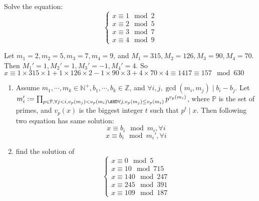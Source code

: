 \documentclass{ctexart}
\begin{document}
\begin{problem}\label{pro:p55.1ii}
  Solve the equation:
  \[
    \begin{cases}
      x \equiv 1 \mod 2 \\
      x \equiv 2 \mod 5 \\
      x \equiv 3 \mod 7 \\
      x \equiv 4 \mod 9
    \end{cases}
  \]
\end{problem}
\begin{solution}
  Let \(m_1=2,m_2=5,m_3=7,m_4=9\), and \(M_1=315,M_2=126,M_3=90,M_4=70\).
  Then \(M_1'=1,M_2'=1,M_3'=-1,M_4'=4\).
  So \(x \equiv 1 \times 315 \times 1 + 1 \times 126 \times 2 - 1 \times 90 \times 3 + 4 \times 70 \times 4 \equiv 1417\equiv 157\mod 630\)
\end{solution}
\begin{problem}\label{pro:3}
  \begin{enumerate}
    \item
      Assume \(m_1,\cdots,m_k \in \mathbb{N}^+,b_1,\cdots,b_k \in \mathbb{Z}\), and \(\forall i,j,\gcd(m_i,m_j) \mid b_i-b_j\).
      Let \(m_i':=\prod_{p \in \mathbb{P},\forall j <i,v_p(m_j)<v_p(m_i) \AND \forall j,v_p(m_j) \leq v_p(m_i)} p^{v_p(m_i)}\), where
      \(\mathbb{P}\) is the set of primes, and \(v_p(x)\) is the biggest integer \(t\) such that \(p^t \mid x\).
      Then following two equation has same solution:
      \begin{equation}\label{equ:1}
        x \equiv b_i \mod m_i,\forall i
      \end{equation}
      \begin{equation}\label{equ:2}
        x \equiv b_i \mod m_i',\forall i
      \end{equation}
    \item find the solution of
      \[
        \begin{cases}
          x \equiv 0 \mod 5     \\
          x \equiv 10 \mod 715  \\
          x \equiv 140 \mod 247 \\
          x \equiv 245 \mod 391 \\
          x \equiv 109 \mod 187
        \end{cases}
      \]
  \end{enumerate}
\end{problem}
\end{document}
